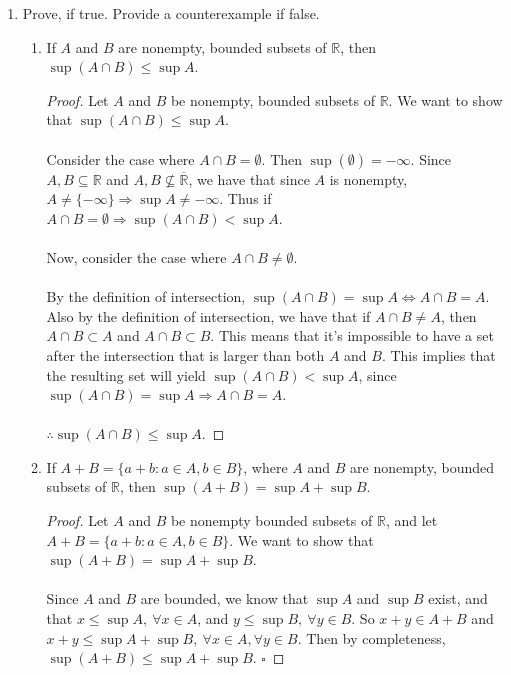 \documentclass[12pt,letterpaper]{article}
\theoremstyle{case}
\begin{document}
\begin{enumerate}
\begin{proof}
			\\\\
			Case 2: If $a \leq 0$, choose $p \in \mathbb{Z}\ \text{s.t.}\ p \geq |a|$. Apply Case 1 to $0 < a + p < b +p$ to get $a+p < \frac{m}{2^n} < b+p$. So $a < \frac{m}{2^n}-p < b$. So $a<q<b,\ \text{where}\ q=\frac{m-2^n*p}{2^n} = \frac{k}{2^n}$.
	\end{proof}
	\item Prove, if true. Provide a counterexample if false.
	\begin{enumerate}
		\item If $A$ and $B$ are nonempty, bounded subsets of $\mathbb{R}$, then $\sup(A \cap B) \leq \sup A$.
		\begin{proof}
			Let $A$ and $B$ be nonempty, bounded subsets of $\mathbb{R}$. We want to show that $\sup (A \cap B) \leq \sup A$.
			\\\\ Consider the case where $A \cap B = \emptyset$. Then $\sup (\emptyset) = -\infty$. Since $A,B \subseteq \mathbb{R}$ and $A,B \nsubseteq \overline{\mathbb{R}}$, we have that since $A$ is nonempty, $A \neq \{-\infty\} \Rightarrow \sup A \neq -\infty$. Thus if $A \cap B = \emptyset \Rightarrow \sup (A \cap B) < \sup A$.
			\\\\Now, consider the case where $A \cap B \neq \emptyset$.
			\\\\By the definition of intersection, $\sup(A \cap B) = \sup A \iff A \cap B = A$. Also by the definition of intersection, we have that if $A \cap B \neq A$, then $A \cap B \subset A$ and $A \cap B \subset B$. This means that it's impossible to have a set after the intersection that is larger than both $A$ and $B$. This implies that the resulting set will yield $\sup (A \cap B) < \sup A$, since $\sup (A \cap B) = \sup A \Rightarrow A \cap B = A$.
			\\\\$\therefore \sup (A \cap B) \leq \sup A$.
		\end{proof}
		\item If $A + B=\{a + b: a\in A, b \in B\}$, where $A$ and $B$ are nonempty, bounded subsets of $\mathbb{R}$, then $\sup(A + B) = \sup A + \sup B$.
		\begin{proof}
			Let $A$ and $B$ be nonempty bounded subsets of $\mathbb{R}$, and let $A+B = \{a + b: a \in A,b \in B\}$. We want to show that $\sup (A+B) = \sup A + \sup B$.
			\\\\Since $A$ and $B$ are bounded, we know that $\sup A$ and $\sup B$ exist, and that $x \leq \sup A,\ \forall x \in A$, and $y \leq \sup B,\ \forall y \in B$. So $x+y \in A+B$ and $x+y \leq \sup A + \sup B,\ \forall x \in A,\forall y \in B$. Then by completeness, $\sup (A+B) \leq \sup A + \sup B$. $\square$

\end{proof}
\end{enumerate}
\end{enumerate}
\end{document}
